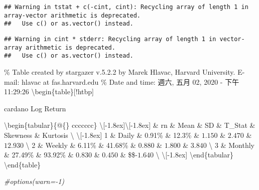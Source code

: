 \documentclass[
]{article}
\newenvironment{Shaded}{\begin{snugshade}}{\end{snugshade}}
\newcommand{\CommentTok}[1]{\textcolor[rgb]{0.56,0.35,0.01}{\textit{#1}}}
\begin{document}
\begin{verbatim}
## Warning in tstat + c(-cint, cint): Recycling array of length 1 in array-vector arithmetic is deprecated.
##   Use c() or as.vector() instead.
\end{verbatim}

\begin{verbatim}
## Warning in cint * stderr: Recycling array of length 1 in vector-array arithmetic is deprecated.
##   Use c() or as.vector() instead.
\end{verbatim}

\% Table created by stargazer v.5.2.2 by Marek Hlavac, Harvard
University. E-mail: hlavac at fas.harvard.edu \% Date and time: 週六,
五月 02, 2020 - 下午 11:29:26 \textbackslash begin\{table\}{[}!htbp{]}
\centering 

\caption{cardano Log Return} 
  \label{}

\textbackslash begin\{tabular\}\{@\{\extracolsep{5pt}\} ccccccc\}
\textbackslash{[}-1.8ex{]}\hline  \hline \textbackslash{[}-1.8ex{]} \&
rn \& Mean \& SD \& T\_Stat \& Skewness \& Kurtosis \textbackslash{}
\hline \textbackslash{[}-1.8ex{]} 1 \& Daily \& 0.91\% \& 12.3\% \&
\(1.150\) \& \(2.470\) \& \(12.930\) \textbackslash{} 2 \& Weekly \&
6.11\% \& 41.68\% \& \(0.880\) \& \(1.800\) \& \(3.840\)
\textbackslash{} 3 \& Monthly \& 27.49\% \& 93.92\% \& \(0.830\) \&
\(0.450\) \& \$\$-\(1.640\) \textbackslash{}
\hline \textbackslash{[}-1.8ex{]} \textbackslash end\{tabular\}
\textbackslash end\{table\}

\begin{Shaded}
\begin{Highlighting}[]
\CommentTok{#options(warn=-1)}
\end{Highlighting}
\end{Shaded}
\end{document}

